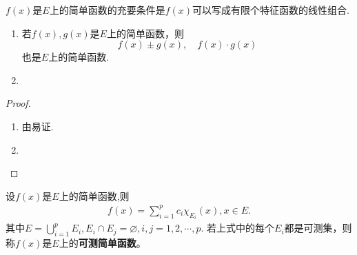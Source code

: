 \documentclass[../../main.tex]{subfiles}
\begin{document}
\begin{corollary}
$f(x)$是$E$上的简单函数的充要条件是$f(x)$可以写成有限个特征函数的线性组合.
\end{corollary}

\begin{proposition}\label{proposition:简单函数的性质}
\begin{enumerate}
\item 若$f(x),g(x)$是$E$上的简单函数，则$$f(x) \pm g(x),\quad f(x) \cdot g(x)$$
也是$E$上的简单函数.

\item 
\end{enumerate}
\end{proposition}
\begin{proof}
\begin{enumerate}
\item 由易证.

\item 
\end{enumerate}
\end{proof}

\begin{definition}[可测简单函数]
设$f(x)$是$E$上的简单函数,则
\begin{align*}
f(x)= \sum_{i = 1}^{p} c_i \chi_{E_i}(x),x \in E.
\end{align*}
其中$E = \bigcup_{i = 1}^{p} E_i,  E_i \cap E_j = \varnothing, i, j = 1, 2, \cdots, p.$
若上式中的每个$E_i$都是可测集，则称$f(x)$是$E$上的\textbf{可测简单函数}。
\end{definition}
\end{document}

